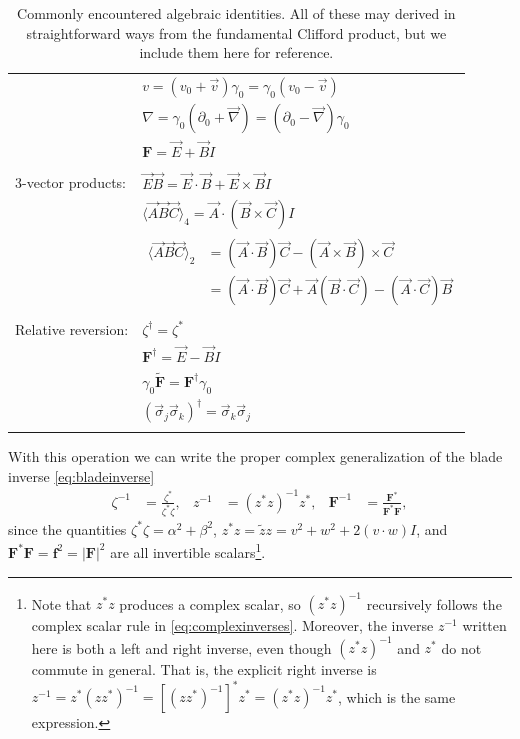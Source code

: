 \documentclass[1p,sort&compress]{elsarticle}
\numberwithin{equation}{section}
\newcommand{\rv}[1]{\vec{#1}}
\newcommand{\bv}[1]{\mathbf{#1}}
\newcommand{\mean}[1]{\langle #1 \rangle}
\begin{document}
\begin{table}
\begin{tabular}{l l}
    & $v = (v_0 + \rv{v})\gamma_0 = \gamma_0(v_0 - \rv{v})$ \\
    & $\nabla = \gamma_0(\partial_0 + \rv{\nabla}) = (\partial_0 - \rv{\nabla})\gamma_0$ \\
    & $\bv{F} = \rv{E} + \rv{B}I$ \\
    \\
    3-vector products:
    & $\rv{E}\rv{B} = \rv{E}\cdot\rv{B} + \rv{E}\times\rv{B}I$ \\
    & $\mean{\rv{A}\rv{B}\rv{C}}_4 = \rv{A}\cdot(\rv{B}\times\rv{C})I$ \\
    & $\begin{aligned}\mean{\rv{A}\rv{B}\rv{C}}_2 &= (\rv{A}\cdot\rv{B})\rv{C} - (\rv{A}\times\rv{B})\times\rv{C} \\
      &= (\rv{A}\cdot\rv{B})\rv{C} + \rv{A}(\rv{B}\cdot\rv{C}) - (\rv{A}\cdot\rv{C})\rv{B} \end{aligned}$ \\
      \\
    Relative reversion:
    & $\zeta^\dagger = \zeta^*$ \\
    & $\bv{F}^\dagger = \rv{E} - \rv{B}I$ \\
    & $\gamma_0\widetilde{\bv{F}} = \bv{F}^\dagger\gamma_0$ \\
    & $(\rv{\sigma}_j\rv{\sigma}_k)^\dagger = \rv{\sigma}_k\rv{\sigma}_j$ \\ \\
    \hline 
  \end{tabular}
  \caption[Algebraic identities]{Commonly encountered algebraic identities.  All of these may derived in straightforward ways from the fundamental Clifford product, but we include them here for reference.}
  \label{tab:identities}
\end{table}

With this operation we can write the proper complex generalization of the blade inverse \eqref{eq:bladeinverse}
\begin{align}\label{eq:complexinverses}
  \zeta^{-1} &= \frac{\zeta^*}{\zeta^*\zeta}, & z^{-1} &= (z^*z)^{-1}z^*, & \bv{F}^{-1} &= \frac{\bv{F}^*}{\bv{F}^*\bv{F}},
\end{align}
since the quantities $\zeta^*\zeta = \alpha^2 + \beta^2$, $z^* z = \widetilde{z}z = v^2 + w^2 + 2 (v\cdot w) I$, and $\bv{F}^* \bv{F} = \bv{f}^2 = |\bv{F}|^2$ are all invertible scalars\footnote{Note that $z^* z$ produces a complex scalar, so $(z^* z)^{-1}$ recursively follows the complex scalar rule in \eqref{eq:complexinverses}.  Moreover, the inverse $z^{-1}$ written here is both a left and right inverse, even though $(z^* z)^{-1}$ and $z^*$ do not commute in general.  That is, the explicit right inverse is $z^{-1} = z^* (zz^*)^{-1} = [(zz^*)^{-1}]^* z^* = (z^*z)^{-1} z^*$, which is the same expression.}.
\end{document}
